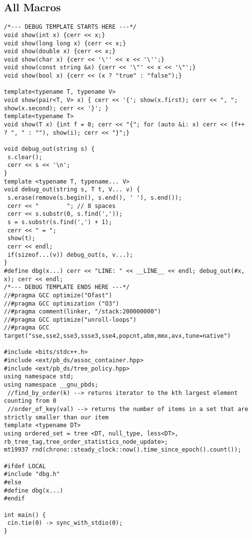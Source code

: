 \documentclass[a4paper,11pt,oneside]{article}
\begin{document}
\begin{multicols*}{\COLS}
\tableofcontents
\newpage
{}


\section{All Macros}
\begin{lstlisting}
/*--- DEBUG TEMPLATE STARTS HERE ---*/
void show(int x) {cerr << x;}
void show(long long x) {cerr << x;}
void show(double x) {cerr << x;}
void show(char x) {cerr << '\'' << x << '\'';}
void show(const string &x) {cerr << '\"' << x << '\"';}
void show(bool x) {cerr << (x ? "true" : "false");}

template<typename T, typename V>
void show(pair<T, V> x) { cerr << '{'; show(x.first); cerr << ", "; show(x.second); cerr << '}'; }
template<typename T>
void show(T x) {int f = 0; cerr << "{"; for (auto &i: x) cerr << (f++ ? ", " : ""), show(i); cerr << "}";}

void debug_out(string s) {
 s.clear();
 cerr << s << '\n';
}
template <typename T, typename... V>
void debug_out(string s, T t, V... v) {
 s.erase(remove(s.begin(), s.end(), ' '), s.end());
 cerr << "        "; // 8 spaces
 cerr << s.substr(0, s.find(','));
 s = s.substr(s.find(',') + 1);
 cerr << " = ";
 show(t);
 cerr << endl;
 if(sizeof...(v)) debug_out(s, v...);
}
#define dbg(x...) cerr << "LINE: " << __LINE__ << endl; debug_out(#x, x); cerr << endl; 
/*--- DEBUG TEMPLATE ENDS HERE ---*/
//#pragma GCC optimize("Ofast")
//#pragma GCC optimization ("O3")
//#pragma comment(linker, "/stack:200000000")
//#pragma GCC optimize("unroll-loops")
//#pragma GCC target("sse,sse2,sse3,ssse3,sse4,popcnt,abm,mmx,avx,tune=native")

#include <bits/stdc++.h>
#include <ext/pb_ds/assoc_container.hpp>
#include <ext/pb_ds/tree_policy.hpp>
using namespace std;
using namespace __gnu_pbds;
 //find_by_order(k) --> returns iterator to the kth largest element counting from 0
 //order_of_key(val) --> returns the number of items in a set that are strictly smaller than our item
template <typename DT> 
using ordered_set = tree <DT, null_type, less<DT>, rb_tree_tag,tree_order_statistics_node_update>;
mt19937 rnd(chrono::steady_clock::now().time_since_epoch().count());

#ifdef LOCAL
#include "dbg.h"
#else
#define dbg(x...)
#endif

int main() {
 cin.tie(0) -> sync_with_stdio(0);
}
\end{lstlisting}

\end{multicols*}
\end{document}
